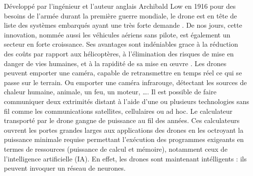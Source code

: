 Développé par l'ingénieur et l'auteur anglais Archibald Low en 1916 pour des besoins de l'armée durant la première guerre mondiale, le drone est en tête de liste des systèmes embarqués ayant une très forte demande \cite{STUDIOFLY}.  
De nos jours, cette innovation, nommée aussi les véhicules aériens sans pilote, est également un secteur en forte croissance. 
Ses avantages sont indéniables grace à la réduction des coûts par rapport aux hélicoptères, à l'élimination des risques de mise en danger de vies humaines, et à la rapidité de sa mise en œuvre \cite{STUDIOFLYa}. 
Les drones peuvent emporter une caméra, capable de retransmettre en temps réel ce qui se passe sur le terrain. 
Ou emporter une caméra infrarouge, détectant les sources de chaleur humaine, animale, un feu, un moteur, \ldots .
Il est possible de faire communiquer deux extrimités distant à l'aide d'une ou plusieurs technologies sans fil comme les communications satellites, cellulaires ou ad hoc.
Le calculateur transporté par le drone gangne de puissance au fil des années. Ces calculateurs ouvrent les portes grandes larges aux applications des drones en les octroyant la puissance minimale requise permettant l'exécution des programmes exigeants en termes de ressources (puissance de calcul et mémoire), notamment ceux de l'intelligence artificielle (IA). En effet, les drones sont maintenant intélligents : ils peuvent invoquer un réseau de neurones.


